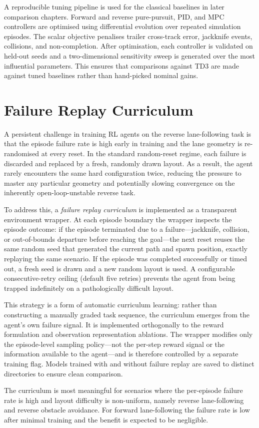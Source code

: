 A reproducible tuning pipeline is used for the classical baselines in later comparison chapters. Forward and reverse pure-pursuit, PID, and MPC controllers are optimised using differential evolution over repeated simulation episodes. The scalar objective penalises trailer cross-track error, jackknife events, collisions, and non-completion. After optimisation, each controller is validated on held-out seeds and a two-dimensional sensitivity sweep is generated over the most influential parameters. This ensures that comparisons against TD3 are made against tuned baselines rather than hand-picked nominal gains.

\section{Failure Replay Curriculum}
\label{sec:failure_replay}

A persistent challenge in training RL agents on the reverse lane-following task is that the episode failure rate is high early in training and the lane geometry is re-randomised at every reset. In the standard random-reset regime, each failure is discarded and replaced by a fresh, randomly drawn layout. As a result, the agent rarely encounters the same hard configuration twice, reducing the pressure to master any particular geometry and potentially slowing convergence on the inherently open-loop-unstable reverse task.

To address this, a \emph{failure replay curriculum} is implemented as a transparent environment wrapper. At each episode boundary the wrapper inspects the episode outcome: if the episode terminated due to a failure---jackknife, collision, or out-of-bounds departure before reaching the goal---the next reset reuses the same random seed that generated the current path and spawn position, exactly replaying the same scenario. If the episode was completed successfully or timed out, a fresh seed is drawn and a new random layout is used. A configurable consecutive-retry ceiling (default five retries) prevents the agent from being trapped indefinitely on a pathologically difficult layout.

This strategy is a form of automatic curriculum learning: rather than constructing a manually graded task sequence, the curriculum emerges from the agent's own failure signal. It is implemented orthogonally to the reward formulation and observation representation ablations. The wrapper modifies only the episode-level sampling policy---not the per-step reward signal or the information available to the agent---and is therefore controlled by a separate training flag. Models trained with and without failure replay are saved to distinct directories to ensure clean comparison.

The curriculum is most meaningful for scenarios where the per-episode failure rate is high and layout difficulty is non-uniform, namely reverse lane-following and reverse obstacle avoidance. For forward lane-following the failure rate is low after minimal training and the benefit is expected to be negligible.

